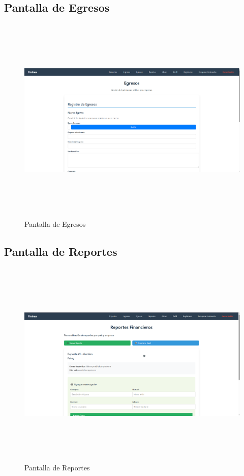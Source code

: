 \subsection{Pantalla de Egresos}
\begin{figure}[H]
    \centering
    \includegraphics[width=15cm, height=10cm]{Archivos/Capturas/Egresos.png}
    \caption{Pantalla de Egresos}
    \label{fig:egresos}
\end{figure}

\subsection{Pantalla de Reportes}
\begin{figure}[H]
    \centering
    \includegraphics[width=15cm, height=10cm]{Archivos/Capturas/Reportes.png}
    \caption{Pantalla de Reportes}
    \label{fig:reportes}
\end{figure}
